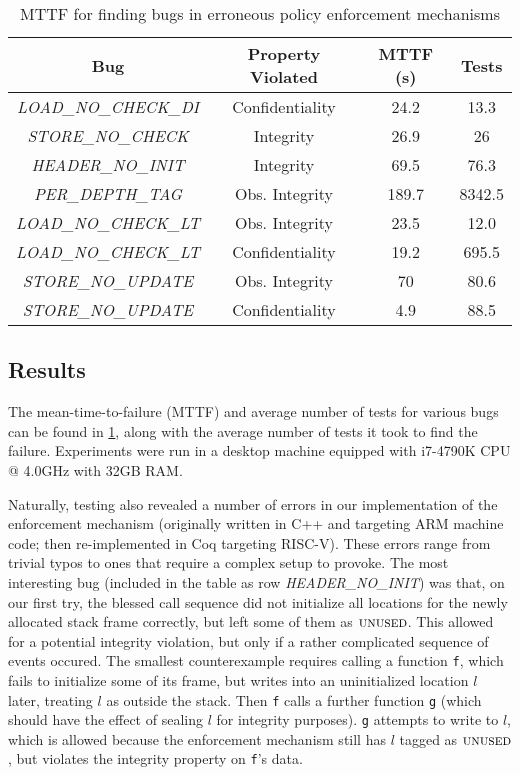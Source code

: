 \documentclass[10pt,conference]{ieeetran}%
\theoremstyle{definition}
\begin{document}
\begin{table}[]
\centering
\begin{tabular}{c|c|c|c}
  Bug & Property Violated & MTTF (s) & Tests \\
  \hline
      {\em LOAD\_NO\_CHECK\_DI}  & Confidentiality & 24.2 & 13.3 \\
      {\em STORE\_NO\_CHECK} & Integrity & 26.9 & 26 \\
      {\em HEADER\_NO\_INIT} & Integrity & 69.5 & 76.3 \\
  \hline
  \hline
      {\em PER\_DEPTH\_TAG} & Obs. Integrity & 189.7 & 8342.5  \\
      {\em LOAD\_NO\_CHECK\_LT}  & Obs. Integrity & 23.5 & 12.0 \\
      {\em LOAD\_NO\_CHECK\_LT}  & Confidentiality & 19.2 & 695.5 \\
      {\em STORE\_NO\_UPDATE} & Obs. Integrity & 70 & 80.6  \\
      {\em STORE\_NO\_UPDATE} & Confidentiality & 4.9 & 88.5 \\
  \hline
\end{tabular}
\vspace*{1em}
\caption{MTTF for finding bugs in erroneous policy enforcement mechanisms}
\vspace*{-2em}
\label{tab:bug-table}
\end{table}

\subsection{Results}

The mean-time-to-failure (MTTF) and average number of tests for various bugs can be found in
\cref{tab:bug-table}, along with the average number of tests
it took to find the failure. Experiments were run in a desktop
machine equipped with i7-4790K CPU @ 4.0GHz with 32GB RAM.

Naturally, testing also revealed a number of errors in our
implementation of the enforcement mechanism (originally written in C++
and targeting ARM machine code;
then re-implemented in Coq targeting RISC-V).  These errors range
from trivial typos to ones that require a %
complex setup
to provoke.  The most interesting bug (included in the table as row
{\em HEADER\_NO\_INIT}) was that, on our first try, the blessed call
sequence %
did not initialize all locations for the
newly allocated stack frame correctly, but left some of them as
$\textsc{unused}$. This allowed for a potential integrity violation, but
only if a rather complicated sequence of events occured.
The smallest counterexample requires calling a function {\tt f},
which fails to initialize some of its frame,
but writes into an uninitialized location $l$ later, treating \(l\) as outside
the stack. Then {\tt f} calls a further function {\tt g} (which should have
the effect of sealing $l$ for integrity purposes). {\tt g} attempts to write to $l$,
which is allowed because the enforcement mechanism still has
$l$ tagged as $\textsc{unused}$, but violates the integrity property on {\tt f}'s data.
\end{document}
